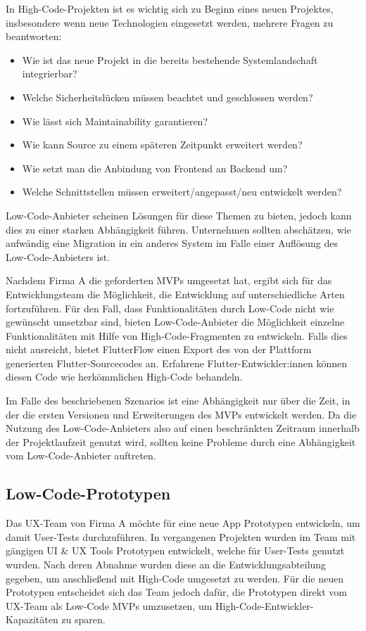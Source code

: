 \documentclass[acmtog, language=ngerman]{acmart}
\begin{document}
In High-Code-Projekten ist es wichtig sich zu Beginn eines neuen Projektes, insbesondere wenn neue Technologien eingesetzt werden, mehrere Fragen zu beantworten: 

\begin{itemize}
    \item Wie ist das neue Projekt in die bereits bestehende Systemlandschaft integrierbar? 
    \item Welche Sicherheitslücken müssen beachtet und geschlossen werden?
    \item Wie lässt sich Maintainability garantieren? 
    \item Wie kann Source zu einem späteren Zeitpunkt erweitert werden? 
    \item Wie setzt man die Anbindung von Frontend an Backend um? 
    \item Welche Schnittstellen müssen erweitert/angepasst/neu entwickelt werden? 
\end{itemize}

Low-Code-Anbieter scheinen Lösungen für diese Themen zu bieten, jedoch kann dies zu einer starken Abhängigkeit führen. Unternehmen sollten abschätzen, wie aufwändig eine Migration in ein anderes System im Falle einer Auflösung des Low-Code-Anbieters ist. 

Nachdem Firma A die geforderten MVPs umgesetzt hat, ergibt sich für das Entwicklungsteam die Möglichkeit, die Entwicklung auf unterschiedliche Arten fortzuführen. Für den Fall, dass Funktionalitäten durch Low-Code nicht wie gewünscht umsetzbar sind, bieten Low-Code-Anbieter die Möglichkeit einzelne Funktionalitäten mit Hilfe von High-Code-Fragmenten zu entwickeln. Falls dies nicht ausreicht, bietet FlutterFlow einen Export des von der Plattform generierten Flutter-Sourcecodes an. Erfahrene Flutter-Entwickler:innen können diesen Code wie herkömmlichen High-Code behandeln.

Im Falle des beschriebenen Szenarios ist eine Abhängigkeit nur über die Zeit, in der die ersten Versionen und Erweiterungen des MVPs entwickelt werden. Da die Nutzung des Low-Code-Anbieters also auf einen beschränkten Zeitraum innerhalb der Projektlaufzeit genutzt wird, sollten keine Probleme durch eine Abhängigkeit vom Low-Code-Anbieter auftreten.

\subsection{Low-Code-Prototypen}

Das UX-Team von Firma A möchte für eine neue App Prototypen entwickeln, um damit User-Tests durchzuführen. In vergangenen Projekten wurden im Team mit gängigen UI \& UX Tools Prototypen entwickelt, welche für User-Tests genutzt wurden. Nach deren Abnahme wurden diese an die Entwicklungsabteilung gegeben, um anschließend mit High-Code umgesetzt zu werden. Für die neuen Prototypen entscheidet sich das Team jedoch dafür, die Prototypen direkt vom UX-Team als Low-Code MVPs umzusetzen, um High-Code-Entwickler-Kapazitäten zu sparen. 
\end{document}
